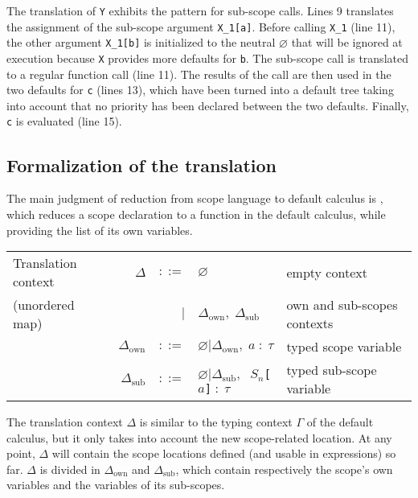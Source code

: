 \documentclass[11pt,a4paper]{article}
\newcommand{\synvar}[1]{\ensuremath{#1}}
\newcommand{\synpunct}[1]{\textcolor{black!40!white}{\texttt{#1}}}
\newcommand{\synlsquare}{\synpunct{[}}
\newcommand{\synrsquare}{\synpunct{]}}
\newcommand{\synemptydefault}{\synvar{\varnothing}}
\newcommand{\syndef}{$ ::= $}
\newcommand{\synalt}{\;$|$\;}
\newcommand{\typctx}[1]{\textcolor{orange!90!black}{\ensuremath{#1}}}
\newcommand{\redctx}[1]{\textcolor{green!50!black}{\ensuremath{#1}}}
\newcommand{\reduces}{\redctx{~\rightsquigarrow~}}
\newcommand{\redvdash}{\redctx{\;\vdash\;}}
\newcommand{\redcomma}{\redctx{,\;}}
\newcommand{\redcolon}{\redctx{\;:\;}}
\newcommand{\redempty}{\redctx{\varnothing}}
\newcommand{\redproduce}{\;\redctx{\Rrightarrow}\;}
\begin{document}
The translation of \Verb+Y+ exhibits the pattern for sub-scope calls.
Lines 9 translates the assignment of the sub-scope argument \Verb+X_1[a]+.
Before calling \Verb+X_1+ (line 11), the other argument \Verb+X_1[b]+ is 
initialized to the neutral \synemptydefault{} that will be ignored at execution 
because \Verb+X+ provides more defaults for \Verb+b+.
The sub-scope call is translated to a regular 
function call (line 11). The results of the call are then used in the two defaults  
for \Verb+c+ (lines 13), which have been turned into a default tree taking into 
account that no priority has been declared between the two defaults.
 Finally, \Verb+c+ is evaluated (line 15). 

\subsection{Formalization of the translation}
\label{sec:scope:formalization}


The main judgment of reduction from scope language to default calculus is 
\fbox{$\synvar{P}\redvdash\synvar{\sigma}\reduces\synvar{e}\redproduce\redctx{\Delta_\mathrm{own}}$}, which reduces 
a scope declaration to a function in the default calculus, while providing the 
list of its own variables.

\begin{center}
  \begin{tabular}{lrrll}
    Translation context&\redctx{\Delta}&\syndef&\redempty&empty context\\
    (unordered map)&&\synalt&\redctx{\Delta_\mathrm{own}}\redcomma\redctx{\Delta_\mathrm{sub}}&own and sub-scopes contexts\\
    &\redctx{\Delta_\mathrm{own}}&\syndef&\redempty\synalt\redctx{\Delta_\mathrm{own}}\redcomma\synvar{a}\redcolon\synvar{\tau}&typed scope variable\\
    &\redctx{\Delta_\mathrm{sub}}&\syndef&\redempty\synalt\redctx{\Delta_\mathrm{sub}}\redcomma
      $\synvar{S}_\synvar{n}$\synlsquare\synvar{a}\synrsquare\redcolon\synvar{\tau}&typed sub-scope variable\\
  \end{tabular}
\end{center}

The translation context \redctx{\Delta} is similar to the typing context \typctx{\Gamma} of 
the default calculus, but it only takes into account the new scope-related location. At any 
point, \redctx{\Delta} will contain the scope locations defined (and usable in expressions) so far.
\redctx{\Delta} is divided in \redctx{\Delta_\mathrm{own}} and \redctx{\Delta_\mathrm{sub}},
which contain respectively the scope's own variables and the variables of its 
sub-scopes.
\end{document}
